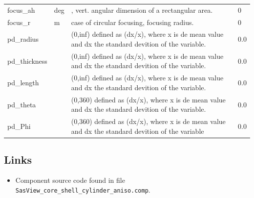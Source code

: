 \begin{longtable}{p{}p{}p{}p{}}
focus\_ah & deg & , vert. angular dimension of a rectangular area. & 0 \\
focus\_r & m & case of circular focusing, focusing radius. & 0 \\
pd\_radius &  & (0,inf) defined as (dx/x), where x is de mean value and dx the standard devition of the variable. & 0.0 \\
pd\_thickness &  & (0,inf) defined as (dx/x), where x is de mean value and dx the standard devition of the variable. & 0.0 \\
pd\_length &  & (0,inf) defined as (dx/x), where x is de mean value and dx the standard devition of the variable. & 0.0 \\
pd\_theta &  & (0,360) defined as (dx/x), where x is de mean value and dx the standard devition of the variable. & 0.0 \\
pd\_Phi &  & (0,360) defined as (dx/x), where x is de mean value and dx the standard devition of the variable & 0.0 \\
\bottomrule
\end{longtable}

\subsection*{Links}
\begin{itemize}
  \item Component source code found in file \texttt{SasView\_core\_shell\_cylinder\_aniso.comp}.
\end{itemize}
